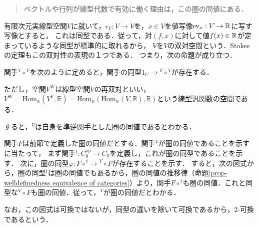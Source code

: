 \documentclass[uplatex, dvipdfmx]{jsreport}
\begin{document}
\begin{remark}\mbox{}
    \begin{quote}
        ベクトルや行列が線型代数で有効に働く理由は，この圏の同値にある．\cite{数学原論}
    \end{quote}
\end{remark}

\begin{example}
    有限次元実線型空間$V$に就いて，$e_V:V\to V\check{}\check{}$を，$x\in V$を値写像$\mathrm{ev}_x:V\check{}\to\mathbb{R}$に写す写像とすると，
    これは同型である．従って，対$(f,x)$に対して値$f(x)\in\mathbb{R}$が定まっているような同型が標準的に取れるから，
    $V\check{}$を$V$の双対空間という．Stokesの定理もこの双対性の表現の１つである．
    つまり，次の命題が成り立つ．
    \begin{proposition}[再双対]
        関手${}^V\circ {}^V$を次のように定めると，関手の同型$1_C\to {}^V\circ {}^V$が存在する．
        \begin{center}\end{center}
        ただし，空間$V^W$は線型空間$V$の再双対といい，$V^W=\mathrm{Hom}_\mathbb{R}(V^V,\mathbb{R})=\mathrm{Hom}_\mathbb{R}(\mathrm{Hom}_\mathbb{R}(V,\mathbb{R}),\mathbb{R})$という線型汎関数の空間である．
    \end{proposition}
    すると，${}^V$は自身を準逆関手とした圏の同値であるとわかる．
\end{example}



関手$F$は前節で定義した圏の同値だとする．関手${}^V$が圏の同値であることを示すに当たって，
まず関手${}^t:C^{op}_0\to C_0$を定義し，これが圏の同型であることを示す．
次に，圏の同型$\varphi :F\circ {}^t\to {}^V\circ F$が存在することを示す．
すると，次の図式から，圏の同型${}^t$は圏の同値でもあるから，圏の同値の推移律（命題\ref{prop-welldefinedness equivalence of categories}）より，関手$F\circ {}^t$も圏の同値．これと同型な${}^V\circ F$も圏の同値．従って，${}^V$が圏の同値だとわかる．
\begin{center}\end{center}
なお，この図式は可換ではないが，同型の違いを除いて可換であるから，2-可換であるという．
\end{document}
